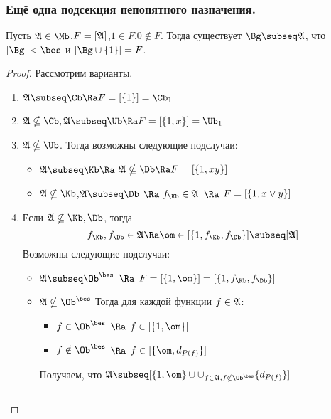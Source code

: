 \documentclass[unicode, 10pt, a4paper, oneside, fleqn]{article}
\begin{document}
\subsubsection{Ещё одна подсекция непонятного назначения.}
\begin{theorem}
  \label{thm}       
  Пусть $\ag\in\Mb$,$F=[\mathfrak{A}]$,$1\in F$,$0\notin F$. Тогда существует $\Bg\subseq\ag$, что
  $|\Bg|<\bes$ и $[\Bg\cup\{1\}]=F$.
\end{theorem}
\begin{proof}
Рассмотрим варианты.
\begin{enumerate}
  \item 
    \begin{math}
      \ag\subseq\Cb \Ra F=\cls{1}=\Cb_1
    \end{math}
  \item 
    \begin{math}
      \ag\nsubseq\Cb,\ag\subseq\Ub \Ra F=\cls{1,x}=\Ub_1
    \end{math}
  \item $\ag\nsubseq\Ub$. Тогда возможны следующие подслучаи:
    \begin{itemize}
      \item  $\ag\subseq\Kb \Ra $ \WHY $\ag\nsubseq\Db\Ra F=\cls{1,xy}$
      \item $\ag\nsubseq\Kb$,$\ag\subseq\Db$ $\Ra$ $\fK\in\ag$ $\Ra$ $F=[\{1,x\vee{y}\}]$
    \end{itemize}
  \item Если $\ag\nsubseq\Kb,\Db$, тогда \WHY
    \begin{displaymath}
      \fK,\fD\in\ag \Ra \om\in\cls{1,\fK,\fD}\subseq[\ag]
    \end{displaymath}
   Возможны следующие подслучаи:
   \begin{itemize}
        \item $\ag\subseq\Oib$ $\Ra$ $F=\cls{1,\om}=\cls{1,\fK,\fD}$
        \item $\ag\nsubseq\Oib$ Тогда для каждой функции $f\in\mathfrak{A}$:
        \begin{itemize}
          \item $f\in\Oib$ $\Ra$ $f\in\cls{1,\om}$
          \item $f\notin\Oib$ $\Ra$ $f\in\cls{\om,d_{P(f)}}$ 
        \end{itemize}
        Получаем, что $\ag\subseq[\{1,\om\}\cup\cup_{f\in\ag,f\notin\Oib}\{d_{P(f)}\}]$
   \end{itemize}
   \begin{df}
     \begin{math}

\end{math}
\end{df}
\end{enumerate}
\end{proof}
\end{document}

